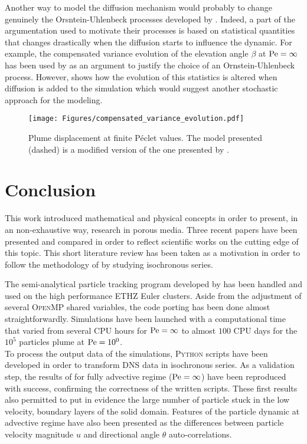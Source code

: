 Another way to model the diffusion mechanism would probably to change genuinely the Orsntein-Uhlenbeck processes developed by \citet{Meyer2016}. 
Indeed, a part of the argumentation used to motivate their processes is based on statistical quantities that changes drastically when the diffusion starts to influence the dynamic.
For example, the compensated variance evolution of the elevation angle $\beta$ at $\mathrm{Pe} = \infty$ has been used by \citet{Meyer2016} as an argument to justify the choice of an Ornstein-Uhlenbeck process.
However,  shows how the evolution of this statistics is altered when diffusion is added to the simulation which would suggest another stochastic approach for the modeling.
\begin{figure}[h!]
	\centering
	\texttt{[image: Figures/compensated\_variance\_evolution.pdf]}
	\caption{Plume displacement at finite Péclet values. The model presented (dashed) is a modified version of the one presented by \citet{Meyer2016}.}
	\label{fig:compensated_variance_evolution}
\end{figure}

\chapter{Conclusion}

This work introduced mathematical and physical concepts in order to present, in an non-exhaustive way, research in porous media.
Three recent papers have been presented and compared in order to reflect scientific works on the cutting edge of this topic.
This short literature review has been taken as a motivation in order to follow the methodology of \citet{Meyer2016} by studying isochronous series.

The semi-analytical particle tracking program developed by \citet{Meyer2017} has been handled and used on the high performance ETHZ Euler clusters.
Aside from the adjustment of several \textsc{OpenMP} shared variables, the code porting has been done almost straightforwardly.
Simulations have been launched with a computational time that varied from several CPU hours for $\mathrm{Pe}=\infty$ to almost $100$ CPU days for the $10^5$ particles plume at $\mathrm{Pe}=10^0$.\\
To process the output data of the simulations, \textsc{Python} scripts have been developed in order to transform DNS data in isochronous series. 
As a validation step, the results of \citet{Meyer2016} for fully advective regime ($\mathrm{Pe}=\infty$) have been reproduced with success, confirming the correctness of the written scripts.
These first results also permitted to put in evidence the large number of particle stuck in the low velocity, boundary layers of the solid domain.
Features of the particle dynamic at advective regime have also been presented as the differences between particle velocity magnitude $u$ and directional angle $\theta$ auto-correlations.

